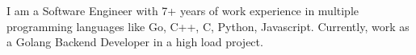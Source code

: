 \documentclass[letter,10pt]{article}
\begin{document}


I am a Software Engineer with 7+ years of work experience in multiple programming languages like Go, C++, C, Python, Javascript. Currently, work as a Golang Backend Developer in a high load project.
\end{document}

